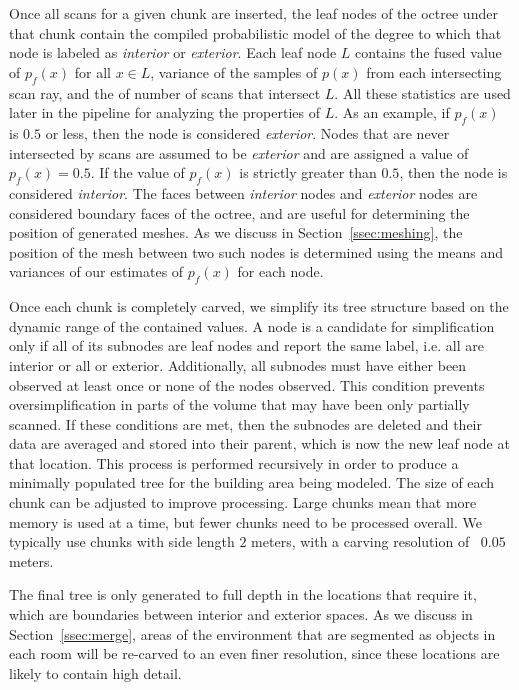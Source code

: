 \documentclass[12pt,onecolumn,oneside]{book}
\begin{document}

Once all scans for a given chunk are inserted, the leaf nodes of the octree under that chunk contain the compiled probabilistic model of the degree to which that node is labeled as {\it interior} or {\it exterior}.  Each leaf node $L$ contains the fused value of $p_f(x)$ for all $x \in L$, variance of the samples of $p(x)$ from each intersecting scan ray, and the of number of scans that intersect $L$.  All these statistics are used later in the pipeline for analyzing the properties of $L$.  As an example, if $p_f(x)$ is $0.5$ or less, then the node is considered {\it exterior}.  Nodes that are never intersected by scans are assumed to be {\it exterior} and are assigned a value of $p_f(x)=0.5$.  If the value of $p_f(x)$ is strictly greater than $0.5$, then the node is considered {\it interior}.  The faces between {\it interior} nodes and {\it exterior} nodes are considered boundary faces of the octree, and are useful for determining the position of generated meshes.  As we discuss in Section~\ref{ssec:meshing}, the position of the mesh between two such nodes is determined using the means and variances of our estimates of $p_f(x)$ for each node.

Once each chunk is completely carved, we simplify its tree structure based on the dynamic range of the contained values.  A node is a candidate for simplification only if all of its subnodes are leaf nodes and report the same label, i.e. all are interior or all or exterior.  Additionally, all subnodes must have either been observed at least once or none of the nodes observed.  This condition prevents oversimplification in parts of the volume that may have been only partially scanned.  If these conditions are met, then the subnodes are deleted and their data are averaged and stored into their parent, which is now the new leaf node at that location.  This process is performed recursively in order to produce a minimally populated tree for the building area being modeled.  The size of each chunk can be adjusted to improve processing.  Large chunks mean that more memory is used at a time, but fewer chunks need to be processed overall.  We typically use chunks with side length $2$ meters, with a carving resolution of ~$0.05$ meters.

The final tree is only generated to full depth in the locations that require it, which are boundaries between interior and exterior spaces.  As we discuss in Section~\ref{ssec:merge}, areas of the environment that are segmented as objects in each room will be re-carved to an even finer resolution, since these locations are likely to contain high detail.
\end{document}
